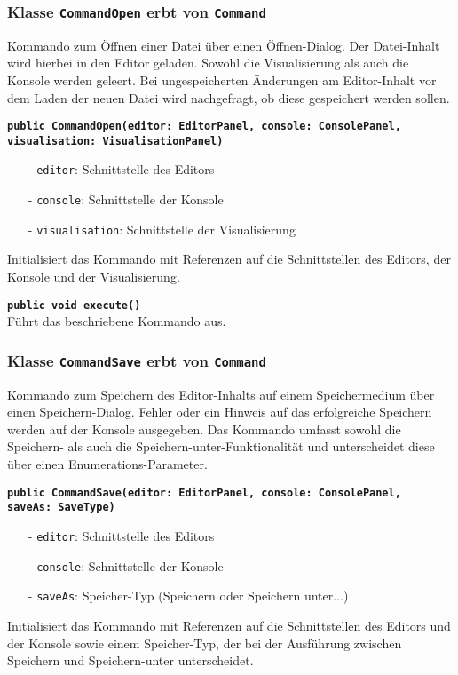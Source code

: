 \documentclass[parskip=full,11pt,twoside]{scrartcl}
\begin{document}
\subsubsection{Klasse \texttt{CommandOpen} erbt von \texttt{Command}}
Kommando zum Öffnen einer Datei über einen Öffnen-Dialog. Der Datei-Inhalt wird hierbei in den Editor geladen. Sowohl die Visualisierung als auch die Konsole werden geleert. Bei ungespeicherten Änderungen am Editor-Inhalt vor dem Laden der neuen Datei wird nachgefragt, ob diese gespeichert werden sollen.

\textbf{\texttt{public CommandOpen(editor: EditorPanel, console: ConsolePanel,\\visualisation: VisualisationPanel)}}\\
\begin{itemize}[noitemsep]
	\item[-] \texttt{editor}: Schnittstelle des Editors
	\item[-] \texttt{console}: Schnittstelle der Konsole
	\item[-] \texttt{visualisation}: Schnittstelle der Visualisierung
\end{itemize}
Initialisiert das Kommando mit Referenzen auf die Schnittstellen des Editors, der Konsole und der Visualisierung.

\textbf{\texttt{public void execute()}}\\
Führt das beschriebene Kommando aus.

\subsubsection{Klasse \texttt{CommandSave} erbt von \texttt{Command}}
Kommando zum Speichern des Editor-Inhalts auf einem Speichermedium über einen Speichern-Dialog. Fehler oder ein Hinweis auf das erfolgreiche Speichern werden auf der Konsole ausgegeben. Das Kommando umfasst sowohl die Speichern- als auch die Speichern-unter-Funktionalität und unterscheidet diese über einen Enumerations-Parameter.

\textbf{\texttt{public CommandSave(editor: EditorPanel, console: ConsolePanel,\\saveAs: SaveType)}}\\
\begin{itemize}[noitemsep]
	\item[-] \texttt{editor}: Schnittstelle des Editors
	\item[-] \texttt{console}: Schnittstelle der Konsole
	\item[-] \texttt{saveAs}: Speicher-Typ (Speichern oder Speichern unter...)
\end{itemize}
Initialisiert das Kommando mit Referenzen auf die Schnittstellen des Editors und der Konsole sowie einem Speicher-Typ, der bei der Ausführung zwischen Speichern und Speichern-unter unterscheidet.
\end{document}
